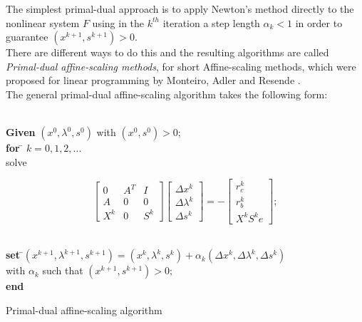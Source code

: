 \documentclass[a4paper,10 pt,titlepage,twoside]{book}
\theoremstyle{plain}
\theoremstyle{definition}
\theoremstyle{remark}
\begin{document}
The simplest primal-dual approach is to apply Newton's method directly to the nonlinear system $F$ using in the $k^{th}$ iteration a step length $\alpha_{k}<1$ in order to guarantee $(x^{k+1},s^{k+1})>0$.\\ There are different ways to do this and the resulting algorithms are called \textit{Primal-dual affine-scaling methods}, for short Affine-scaling methods, which were proposed for linear programming by Monteiro,
Adler and Resende \cite{MARE}.\\ 
 The general primal-dual affine-scaling algorithm takes the following form:\\
\begin{algorithm}[H]
\begin{tabbing}
	\\
	\textbf{Given} $(x^{0}, \lambda^{0}, s^{0})$ with $(x^{0}, s^{0})>0$;\\
	\textbf{for} \= $k = 0, 1, 2,...$ \\
	\> solve
	\end{tabbing}
\begin{equation}\label{mtx:aff}\tag{4.1b}	
\begin{bmatrix}
0&A^{T}&I \\A& 0&0\\X^{k}&0&S^{k}
\end{bmatrix}\begin{bmatrix}
\Delta x^{k}\\\Delta\lambda^{k} \\\Delta s^{k}
\end{bmatrix}=-\begin{bmatrix}
r_{c}^{k}\\r_{b}^{k}\\X^{k}S^{k}e
\end{bmatrix};
\end{equation}
\begin{tabbing}
	\\
	\=\textbf{set} \=$(x^{k+1}, \lambda^{k+1}, s^{k+1}) = (x^{k}, \lambda^{k}, s^{k})+ \alpha_{k}(\Delta x^{k}, \Delta\lambda^{k}, \Delta s^{k})$
	\\
	\>\> with $\alpha_{k}$ such that $(x^{k+1}, s^{k+1})>0$; \\
	\textbf{end}
\end{tabbing}
\caption{\label{alg:AS}Primal-dual affine-scaling algorithm}
\end{algorithm}
\end{document}
